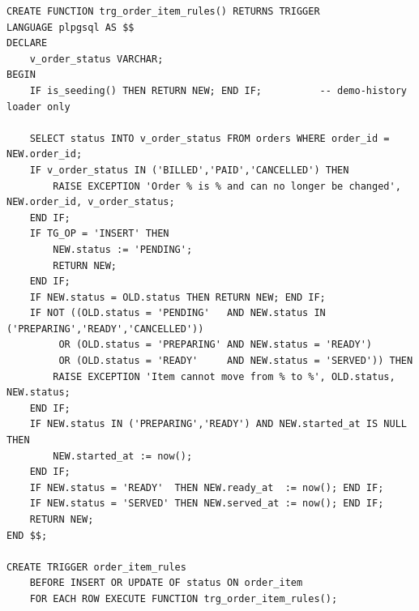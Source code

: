 \documentclass[11pt,a4paper]{report}
\begin{document}
\begin{lstlisting}[caption={State-machine trigger (from \texttt{02\_logic.sql})}]
CREATE FUNCTION trg_order_item_rules() RETURNS TRIGGER
LANGUAGE plpgsql AS $$
DECLARE
    v_order_status VARCHAR;
BEGIN
    IF is_seeding() THEN RETURN NEW; END IF;          -- demo-history loader only

    SELECT status INTO v_order_status FROM orders WHERE order_id = NEW.order_id;
    IF v_order_status IN ('BILLED','PAID','CANCELLED') THEN
        RAISE EXCEPTION 'Order % is % and can no longer be changed', NEW.order_id, v_order_status;
    END IF;
    IF TG_OP = 'INSERT' THEN
        NEW.status := 'PENDING';
        RETURN NEW;
    END IF;
    IF NEW.status = OLD.status THEN RETURN NEW; END IF;
    IF NOT ((OLD.status = 'PENDING'   AND NEW.status IN ('PREPARING','READY','CANCELLED'))
         OR (OLD.status = 'PREPARING' AND NEW.status = 'READY')
         OR (OLD.status = 'READY'     AND NEW.status = 'SERVED')) THEN
        RAISE EXCEPTION 'Item cannot move from % to %', OLD.status, NEW.status;
    END IF;
    IF NEW.status IN ('PREPARING','READY') AND NEW.started_at IS NULL THEN
        NEW.started_at := now();
    END IF;
    IF NEW.status = 'READY'  THEN NEW.ready_at  := now(); END IF;
    IF NEW.status = 'SERVED' THEN NEW.served_at := now(); END IF;
    RETURN NEW;
END $$;

CREATE TRIGGER order_item_rules
    BEFORE INSERT OR UPDATE OF status ON order_item
    FOR EACH ROW EXECUTE FUNCTION trg_order_item_rules();
\end{lstlisting}
\end{document}
